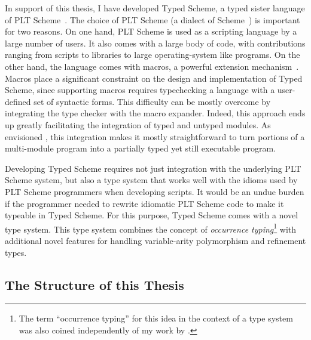 In support of this thesis, I have developed Typed
Scheme,
a typed sister language of PLT
Scheme~\cite{thf:dls2006,ctf:macros,thf:popl08,sthf:variable-arity}. 
The choice of PLT Scheme  (a dialect of Scheme~\cite{r6rs,ss:scheme}) 
is important for two reasons.
 On one hand, PLT Scheme is used as a scripting language
by a large number of users. It also comes with a large body of code,
with contributions ranging from scripts to libraries to large
operating-system like programs.  On the other hand, the language comes
with macros, a powerful extension mechanism~\cite{f:modules}. Macros
place a significant constraint on the design and implementation of
Typed Scheme, since supporting macros requires typechecking a language
with a user-defined set of syntactic forms.  This difficulty can be
mostly overcome by integrating the type checker with the macro
expander.  Indeed, this approach ends up greatly facilitating the
integration of typed and untyped modules.  As envisioned
\cite{thf:dls2006}, this integration makes it mostly straightforward
to turn portions of a multi-module program into a partially typed yet
still executable program.

Developing Typed Scheme requires not just integration with the
underlying PLT Scheme system, but also a type system that works well
with the idioms used by PLT Scheme programmers when developing
scripts.  It would be an undue burden if the programmer needed to
rewrite idiomatic PLT Scheme code to make it typeable in Typed Scheme.
For this purpose, Typed Scheme comes with a novel type system.  This type
system combines the concept of \emph{occurrence typing}\footnote{The
  term ``occurrence typing'' for this idea in the 
  context of a type system was also coined independently of my work by
  \citet{krcf:occurrence}.} 
 with
additional novel features for handling variable-arity polymorphism and
refinement types.  

\subsection*{The Structure of this Thesis}

